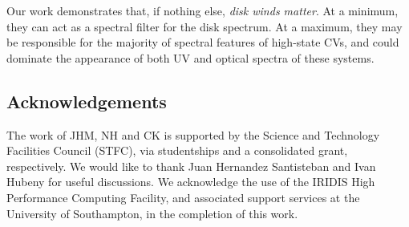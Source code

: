 \documentclass[preprint, a4paper, 11pt]{aastex}
\begin{document}
Our work demonstrates that, if nothing else,
{\sl disk winds matter}. At a minimum,
they can act as a spectral filter
for the disk spectrum. At a maximum, they may be responsible
for the majority of spectral features of high-state CVs,
and could dominate the appearance of both UV and optical
spectra of these systems.







\subsection*{Acknowledgements}
The work of JHM, NH and CK is supported by the Science and Technology Facilities Council (STFC), 
via studentships and a consolidated grant, respectively. We would like to thank Juan Hernandez Santisteban and Ivan Hubeny 
for useful discussions. We acknowledge the use of the IRIDIS High Performance Computing Facility, 
and associated support services at the University of Southampton, in the completion of this work.


\newpage
\newpage

\end{document}
